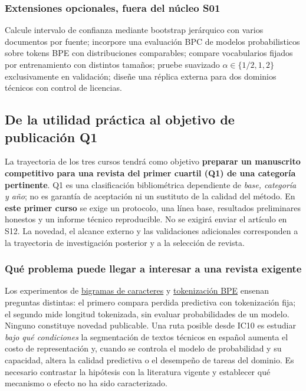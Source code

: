 \subsubsection*{Extensiones opcionales, fuera del núcleo S01}
Calcule intervalo de confianza mediante bootstrap jerárquico con varios
documentos por fuente; incorpore una evaluación BPC de modelos probabilisticos sobre tokens
BPE con distribuciones comparables; compare
vocabularios fijados por entrenamiento con distintos tamaños; pruebe
suavizado $\alpha\in\{1/2,1,2\}$ exclusivamente en validación; diseñe una
réplica externa para dos dominios técnicos con control de licencias.




\subsection{De la utilidad práctica al objetivo de publicación Q1}
\label{s01:mod:invest}
\begin{investigacion}
La trayectoria de los tres cursos tendrá como objetivo
\textbf{preparar un manuscrito competitivo para una revista del primer
cuartil (Q1) de una categoría pertinente}. Q1 es una clasificación
bibliométrica dependiente de \emph{base, categoría y año}; no es garantía
de aceptación ni un sustituto de la calidad del método.
En \textbf{este primer curso} se exige un protocolo, una línea base,
resultados preliminares honestos y un informe técnico reproducible.
No se exigirá enviar el artículo en S12. La novedad, el alcance externo y
las validaciones adicionales corresponden a la trayectoria de investigación
posterior y a la selección de revista.
\end{investigacion}
\subsubsection*{Qué problema puede llegar a interesar a una revista exigente}
Los experimentos de \hyperref[s01:lab:comp]{bigramas de caracteres}
y \hyperref[s01:lab:ic10]{tokenización BPE} ensenan preguntas distintas:
el primero compara perdida predictiva con tokenización fija; el segundo
mide longitud tokenizada, sin evaluar probabilidades de un modelo.
Ninguno constituye novedad publicable. Una ruta posible desde IC10 es estudiar
\emph{bajo qué condiciones} la segmentación de textos técnicos en español
aumenta el costo de representación y, cuando se controla el modelo de
probabilidad y su capacidad, altera la calidad predictiva o el desempeño
de tareas del dominio. Es necesario contrastar la hipótesis con la literatura
vigente y establecer qué mecanismo o efecto no ha sido caracterizado.
